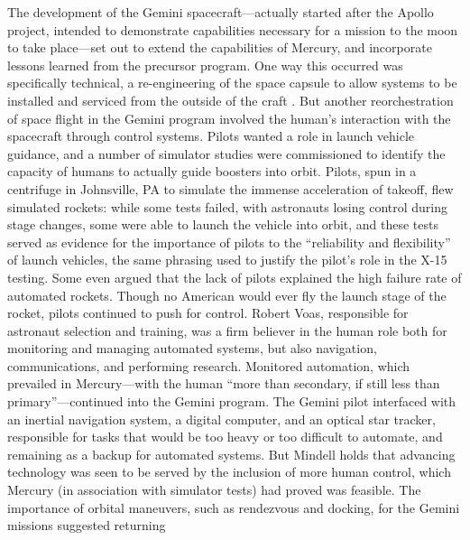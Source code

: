 
The development of the Gemini spacecraft---actually started after the
Apollo project, intended to demonstrate capabilities necessary for
a mission to the moon to take place---set out to extend the
capabilities of Mercury, and incorporate lessons learned from the
precursor program. One way this occurred was specifically technical, a
re-engineering of the space capsule to allow systems to be installed
and serviced from the outside of the craft \cite{NASAGeminiConcept}. But another
reorchestration of space flight in the Gemini program involved the
human's interaction with the spacecraft through control systems.
Pilots wanted a role in launch vehicle guidance, and a number of
simulator studies were commissioned to identify the capacity of humans to
actually guide boosters into orbit. Pilots, spun in a
centrifuge in Johnsville, PA to simulate the immense acceleration of
takeoff, flew
simulated rockets: while some tests failed, with astronauts losing
control during stage changes, some were able to launch the vehicle
into orbit, and these tests served as evidence for the importance of
pilots to the ``reliability and flexibility'' of launch vehicles,
the same phrasing used to justify the pilot's role in the X-15
testing\cite[p. 72]{DM}. Some even argued that the lack of pilots
explained the high failure rate of automated rockets\cite[p. 73]{DM}.
Though no American would ever fly the launch stage of
the rocket, pilots continued to push for control. Robert Voas,
responsible for astronaut selection and training, was a firm believer
in the human role both for monitoring and managing automated systems,
but also 
navigation, communications, and performing research\cite[p. 77]{DM}.
Monitored automation, which prevailed in Mercury---with
the human ``more than secondary, if still less than primary''\cite[p.
  77]{DM}---continued into the Gemini program. The Gemini pilot
interfaced with an inertial navigation system, a digital computer, and
an optical star tracker, responsible for tasks that would be too heavy
or too difficult to automate, and remaining as a backup for automated
systems. But Mindell holds that advancing
technology was seen to be served by the inclusion of more human
control, which Mercury (in association with simulator tests) had proved was
feasible\cite[p. 84]{DM}. The importance of orbital maneuvers,
 such as rendezvous and docking, for the Gemini missions suggested returning
